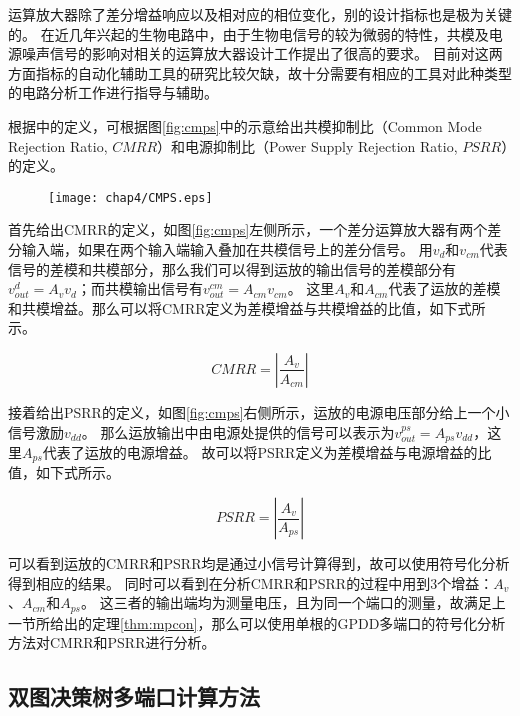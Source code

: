 运算放大器除了差分增益响应以及相对应的相位变化，别的设计指标也是极为关键的。
在近几年兴起的生物电路中，由于生物电信号的较为微弱的特性，共模及电源噪声信号的影响对相关的运算放大器设计工作提出了很高的要求\parencite{Sawan-CMRR-1999,Abdullah-Biopotential-2015,Paul-22dBPSRR-2012}。
目前对这两方面指标的自动化辅助工具的研究比较欠缺，故十分需要有相应的工具对此种类型的电路分析工作进行指导与辅助。

根据\parencite{GRAY-Analog}中的定义，可根据图\ref{fig:cmps}中的示意给出共模抑制比（Common Mode Rejection Ratio, $CMRR$）和电源抑制比（Power Supply Rejection Ratio, $PSRR$）的定义。

\begin{figure}[!htp]
	\centering
	\texttt{[image: chap4/CMPS.eps]}
\end{figure}

首先给出CMRR的定义，如图\ref{fig:cmps}左侧所示，一个差分运算放大器有两个差分输入端，如果在两个输入端输入叠加在共模信号上的差分信号。
用$v_d$和$v_{cm}$代表信号的差模和共模部分，那么我们可以得到运放的输出信号的差模部分有$v_{out}^{d} = A_v v_d$；而共模输出信号有$v_{out}^{cm} = A_{cm} v_{cm}$。
这里$A_v$和$A_{cm}$代表了运放的差模和共模增益。那么可以将CMRR定义为差模增益与共模增益的比值，如下式所示。

\begin{equation}
CMRR = \left|\frac{A_v}{A_{cm}}\right|
\end{equation}

接着给出PSRR的定义，如图\ref{fig:cmps}右侧所示，运放的电源电压部分给上一个小信号激励$v_{dd}$。
那么运放输出中由电源处提供的信号可以表示为$v_{out}^{ps} = A_{ps}v_{dd}$，这里$A_{ps}$代表了运放的电源增益。
故可以将PSRR定义为差模增益与电源增益的比值，如下式所示。

\begin{equation}
PSRR = \left|\frac{A_v}{A_{ps}}\right|
\end{equation}

可以看到运放的CMRR和PSRR均是通过小信号计算得到，故可以使用符号化分析得到相应的结果。
同时可以看到在分析CMRR和PSRR的过程中用到3个增益：$A_v$、$A_{cm}$和$A_{ps}$。
这三者的输出端均为测量电压，且为同一个端口的测量，故满足上一节所给出的定理\ref{thm:mpcon}，那么可以使用单根的GPDD多端口的符号化分析方法对CMRR和PSRR进行分析。

\subsection{双图决策树多端口计算方法}
\label{subsec:cmps:cmrrpsrr:cal}

